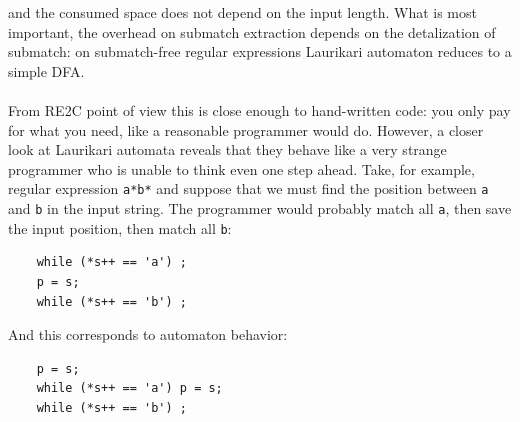 \documentclass{article}
\newenvironment{Xfig}
    {\par\medskip\noindent\minipage{\linewidth}\begin{center}}
    {\end{center}\endminipage\par\medskip}
\theoremstyle{definition}
\begin{document}
\begin{multicols}{2}
and the consumed space does not depend on the input length.
What is most important, the overhead on submatch extraction depends on the detalization of submatch:
on submatch-free regular expressions Laurikari automaton reduces to a simple DFA.
\\ \\
From RE2C point of view this is close enough to hand-written code:
you only pay for what you need, like a reasonable programmer would do.
However, a closer look at Laurikari automata reveals that
they behave like a very strange programmer who is unable to think even one step ahead.
Take, for example, regular expression \texttt{a*b*}
and suppose that we must find the position between \texttt{a} and \texttt{b} in the input string.
The programmer would probably match all \texttt{a}, then save the input position, then match all \texttt{b}:

\begin{Xfig}
\begin{small}
\begin{verbatim}
    while (*s++ == 'a') ;
    p = s;
    while (*s++ == 'b') ;
\end{verbatim}
\end{small}
\end{Xfig}

And this corresponds to automaton behavior:

\begin{Xfig}
\begin{small}
\begin{verbatim}
    p = s;
    while (*s++ == 'a') p = s;
    while (*s++ == 'b') ;
\end{verbatim}
\end{small}
\end{Xfig}


\end{multicols}
\end{document}
